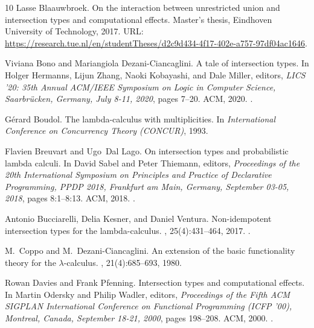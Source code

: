 \documentclass[10pt,a4paper]{amsart}
\begin{document}
\begin{thebibliography}{10}
Lasse Blaauwbroek.
\newblock On the interaction between unrestricted union and intersection types
  and computational effects.
\newblock Master's thesis, Eindhoven University of Technology, 2017.
\newblock URL:
  \url{https://research.tue.nl/en/studentTheses/d2c9d434-4f17-402e-a757-97df04ac1646}.

Viviana Bono and Mariangiola Dezani{-}Ciancaglini.
\newblock A tale of intersection types.
\newblock In Holger Hermanns, Lijun Zhang, Naoki Kobayashi, and Dale Miller,
  editors, {\em {LICS} '20: 35th Annual {ACM/IEEE} Symposium on Logic in
  Computer Science, Saarbr{\"{u}}cken, Germany, July 8-11, 2020}, pages 7--20.
  {ACM}, 2020.
\newblock \href {https://doi.org/10.1145/3373718.3394733}
  {}.

G{\'e}rard Boudol.
\newblock The lambda-calculus with multiplicities.
\newblock In {\em International Conference on Concurrency Theory (CONCUR)},
  1993.

Flavien Breuvart and Ugo~Dal Lago.
\newblock On intersection types and probabilistic lambda calculi.
\newblock In David Sabel and Peter Thiemann, editors, {\em Proceedings of the
  20th International Symposium on Principles and Practice of Declarative
  Programming, {PPDP} 2018, Frankfurt am Main, Germany, September 03-05, 2018},
  pages 8:1--8:13. {ACM}, 2018.
\newblock \href {https://doi.org/10.1145/3236950.3236968}
  {}.

Antonio Bucciarelli, Delia Kesner, and Daniel Ventura.
\newblock Non-idempotent intersection types for the lambda-calculus.
, 25(4):431--464, 2017.
\newblock \href {https://doi.org/10.1093/JIGPAL/JZX018}
  {}.

M.~Coppo and M.~Dezani-Ciancaglini.
\newblock An extension of the basic functionality theory for the
  $\lambda$-calculus.
, 21(4):685--693, 1980.

Rowan Davies and Frank Pfenning.
\newblock Intersection types and computational effects.
\newblock In Martin Odersky and Philip Wadler, editors, {\em Proceedings of the
  Fifth {ACM} {SIGPLAN} International Conference on Functional Programming
  {(ICFP} '00), Montreal, Canada, September 18-21, 2000}, pages 198--208.
  {ACM}, 2000.
\newblock \href {https://doi.org/10.1145/351240.351259}
  {}.


\end{thebibliography}
\end{document}
